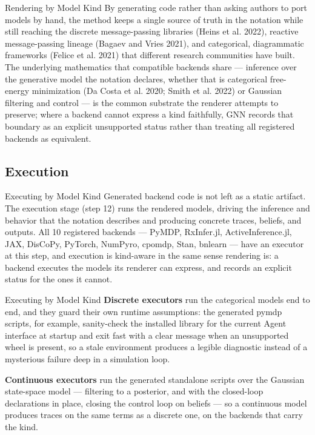 \documentclass[
  ignorenonframetext,
]{beamer}
\begin{document}
\begin{frame}{Rendering by Model Kind}
By generating code rather than asking authors to port models by hand,
the method keeps a single source of truth in the notation while still
reaching the discrete message-passing libraries (Heins et al. 2022),
reactive message-passing lineage (Bagaev and Vries 2021), and
categorical, diagrammatic frameworks (Felice et al. 2021) that different
research communities have built. The underlying mathematics that
compatible backends share --- inference over the generative model the
notation declares, whether that is categorical free-energy minimization
(Da Costa et al. 2020; Smith et al. 2022) or Gaussian filtering and
control --- is the common substrate the renderer attempts to preserve;
where a backend cannot express a kind faithfully, GNN records that
boundary as an explicit unsupported status rather than treating all
registered backends as equivalent.
\end{frame}

\subsection{Execution}\label{execution}

\begin{frame}{Executing by Model Kind}
\protect{}\label{executing-by-model-kind}
Generated backend code is not left as a static artifact. The execution
stage (step 12) runs the rendered models, driving the inference and
behavior that the notation describes and producing concrete traces,
beliefs, and outputs. All 10 registered backends --- PyMDP, RxInfer.jl,
ActiveInference.jl, JAX, DisCoPy, PyTorch, NumPyro, cpomdp, Stan,
bnlearn --- have an executor at this step, and execution is kind-aware
in the same sense rendering is: a backend executes the models its
renderer can express, and records an explicit status for the ones it
cannot.

\end{frame}

\begin{frame}{Executing by Model Kind}
\textbf{Discrete executors} run the categorical models end to end, and
they guard their own runtime assumptions: the generated pymdp scripts,
for example, sanity-check the installed library for the current Agent
interface at startup and exit fast with a clear message when an
unsupported wheel is present, so a stale environment produces a legible
diagnostic instead of a mysterious failure deep in a simulation loop.

\textbf{Continuous executors} run the generated standalone scripts over
the Gaussian state-space model --- filtering to a posterior, and with
the closed-loop declarations in place, closing the control loop on
beliefs --- so a continuous model produces traces on the same terms as a
discrete one, on the backends that carry the kind.

\end{frame}
\end{document}
